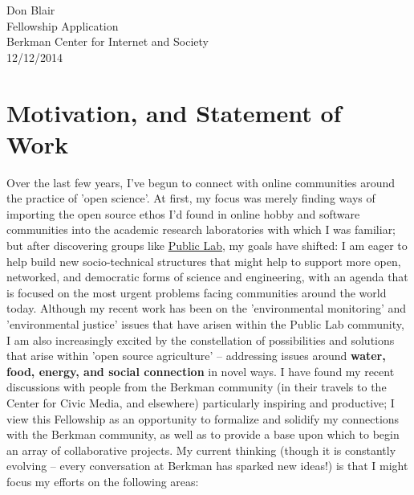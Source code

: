 \documentclass[10pt]{article}
\begin{document}
\setlength\parindent{0pt}

Don Blair\\
Fellowship Application \\
Berkman Center for Internet and Society \\
12/12/2014


\section*{Motivation, and Statement of Work}

Over the last few years, I've begun to connect with online communities around the practice of 'open science'.  At first, my focus was merely finding ways of importing the open source ethos I'd found in online hobby and software communities into the academic research laboratories with which I was familiar; but after discovering groups like \href{http://publiclab.org}{Public Lab}, my goals have shifted:  I am eager to help build new socio-technical structures that might help to support more open, networked, and democratic forms of science and engineering, with an agenda that is focused on the most urgent problems facing communities around the world today.  Although my recent work has been on the 'environmental monitoring' and 'environmental justice' issues that have arisen within the Public Lab community, I am also increasingly excited by the constellation of possibilities and solutions that arise within 'open source agriculture' -- addressing issues around {\bf water, food, energy, and social connection} in novel ways.  I have found my recent discussions with people from the Berkman community (in their travels to the Center for Civic Media, and elsewhere) particularly inspiring and productive; I view this Fellowship as an opportunity to formalize and solidify my connections with the Berkman community, as well as to provide a base upon which to begin an array of collaborative projects.  My current thinking (though it is constantly evolving -- every conversation at Berkman has sparked new ideas!) is that I might focus my efforts on the following areas:
\end{document}
